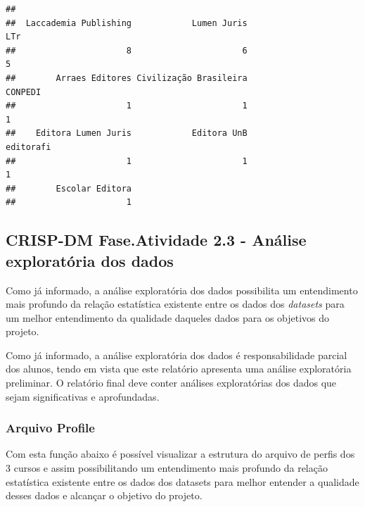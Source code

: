 \documentclass[]{article}
\newenvironment{Shaded}{\begin{snugshade}}{\end{snugshade}}
\newcommand{\KeywordTok}[1]{\textcolor[rgb]{0.13,0.29,0.53}{\textbf{#1}}}
\newcommand{\DataTypeTok}[1]{\textcolor[rgb]{0.13,0.29,0.53}{#1}}
\newcommand{\DecValTok}[1]{\textcolor[rgb]{0.00,0.00,0.81}{#1}}
\newcommand{\StringTok}[1]{\textcolor[rgb]{0.31,0.60,0.02}{#1}}
\newcommand{\OtherTok}[1]{\textcolor[rgb]{0.56,0.35,0.01}{#1}}
\newcommand{\OperatorTok}[1]{\textcolor[rgb]{0.81,0.36,0.00}{\textbf{#1}}}
\newcommand{\NormalTok}[1]{#1}
\begin{document}
\begin{Shaded}
\end{Shaded}

\begin{verbatim}
## 
##  Laccademia Publishing            Lumen Juris                    LTr 
##                      8                      6                      5 
##        Arraes Editores Civilização Brasileira                CONPEDI 
##                      1                      1                      1 
##    Editora Lumen Juris            Editora UnB              editorafi 
##                      1                      1                      1 
##        Escolar Editora 
##                      1
\end{verbatim}

\subsection{CRISP-DM Fase.Atividade 2.3 - Análise exploratória dos
dados}\label{crisp-dm-fase.atividade-2.3---analise-exploratoria-dos-dados}

Como já informado, a análise exploratória dos dados possibilita um
entendimento mais profundo da relação estatística existente entre os
dados dos \emph{datasets} para um melhor entendimento da qualidade
daqueles dados para os objetivos do projeto.

Como já informado, a análise exploratória dos dados é responsabilidade
parcial dos alunos, tendo em vista que este relatório apresenta uma
análise exploratória preliminar. O relatório final deve conter análises
exploratórias dos dados que sejam significativas e aprofundadas.

\subsubsection{Arquivo Profile}\label{arquivo-profile}

Com esta função abaixo é possível visualizar a estrutura do arquivo de
perfis dos 3 cursos e assim possibilitando um entendimento mais profundo
da relação estatística existente entre os dados dos datasets para melhor
entender a qualidade desses dados e alcançar o objetivo do projeto.
\end{document}
